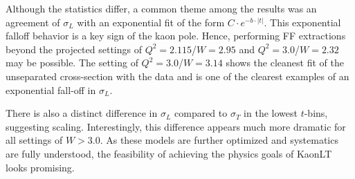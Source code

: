 \documentclass[
]{report}
\begin{document}
Although the statistics differ, a common theme among the results was an
agreement of \(\sigma_L\) with an exponential fit of the form
\(C\cdot e^{-b\cdot|t|}\). This exponential falloff behavior is a key
sign of the kaon pole. Hence, performing FF extractions beyond the
projected settings of \(Q^2=2.115\)/\(W=2.95\) and
\(Q^2=3.0\)/\(W=2.32\) may be possible. The setting of
\(Q^2=3.0\)/\(W=3.14\) shows the cleanest fit of the unseparated
cross-section with the data and is one of the clearest examples of an
exponential fall-off in \(\sigma_L\).

There is also a distinct difference in \(\sigma_L\) compared to
\(\sigma_T\) in the lowest \(t\)-bins, suggesting scaling.
Interestingly, this difference appears much more dramatic for all
settings of \(W>3.0\). As these models are further optimized and
systematics are fully understood, the feasibility of achieving the
physics goals of KaonLT looks promising.

\label{Chapter-6-1}







\FloatBarrier

\label{Chapter-6-2}







\FloatBarrier

\label{Chapter-6-3}







\FloatBarrier

\label{Chapter-6-4}






\end{document}
